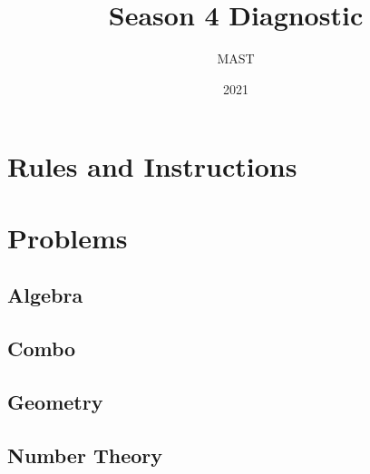 \documentclass[mast]{lucky}
\title{Season 4 Diagnostic}
\author{MAST}
\date{2021}
\begin{document}
\maketitle

\section{Rules and Instructions}

\section{Problems}

\subsection{Algebra}

\subsection{Combo}

\subsection{Geometry}

\subsection{Number Theory}
\end{document}
